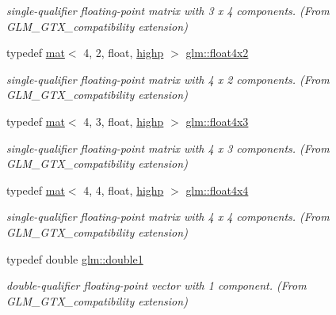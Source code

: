 \begin{DoxyCompactItemize}
\begin{DoxyCompactList}\small\item\em single-\/qualifier floating-\/point matrix with 3 x 4 components. (From G\+L\+M\+\_\+\+G\+T\+X\+\_\+compatibility extension) \end{DoxyCompactList}\item 
typedef \hyperlink{structglm_1_1mat}{mat}$<$ 4, 2, float, \hyperlink{namespaceglm_a36ed105b07c7746804d7fdc7cc90ff25ac6f7eab42eacbb10d59a58e95e362074}{highp} $>$ \hyperlink{group__gtx__compatibility_gac7ba369299599a807491b9e871a0184e}{glm\+::float4x2}
\begin{DoxyCompactList}\small\item\em single-\/qualifier floating-\/point matrix with 4 x 2 components. (From G\+L\+M\+\_\+\+G\+T\+X\+\_\+compatibility extension) \end{DoxyCompactList}\item 
typedef \hyperlink{structglm_1_1mat}{mat}$<$ 4, 3, float, \hyperlink{namespaceglm_a36ed105b07c7746804d7fdc7cc90ff25ac6f7eab42eacbb10d59a58e95e362074}{highp} $>$ \hyperlink{group__gtx__compatibility_ga656a2d21cf92696b10063da4f431eecd}{glm\+::float4x3}
\begin{DoxyCompactList}\small\item\em single-\/qualifier floating-\/point matrix with 4 x 3 components. (From G\+L\+M\+\_\+\+G\+T\+X\+\_\+compatibility extension) \end{DoxyCompactList}\item 
typedef \hyperlink{structglm_1_1mat}{mat}$<$ 4, 4, float, \hyperlink{namespaceglm_a36ed105b07c7746804d7fdc7cc90ff25ac6f7eab42eacbb10d59a58e95e362074}{highp} $>$ \hyperlink{group__gtx__compatibility_ga32ecd052006dea588730d2a077c5896c}{glm\+::float4x4}
\begin{DoxyCompactList}\small\item\em single-\/qualifier floating-\/point matrix with 4 x 4 components. (From G\+L\+M\+\_\+\+G\+T\+X\+\_\+compatibility extension) \end{DoxyCompactList}\item 
typedef double \hyperlink{group__gtx__compatibility_gab8b88350212cea916857cb2f49b8a29f}{glm\+::double1}
\begin{DoxyCompactList}\small\item\em double-\/qualifier floating-\/point vector with 1 component. (From G\+L\+M\+\_\+\+G\+T\+X\+\_\+compatibility extension) \end{DoxyCompactList}\item 

\end{DoxyCompactItemize}
